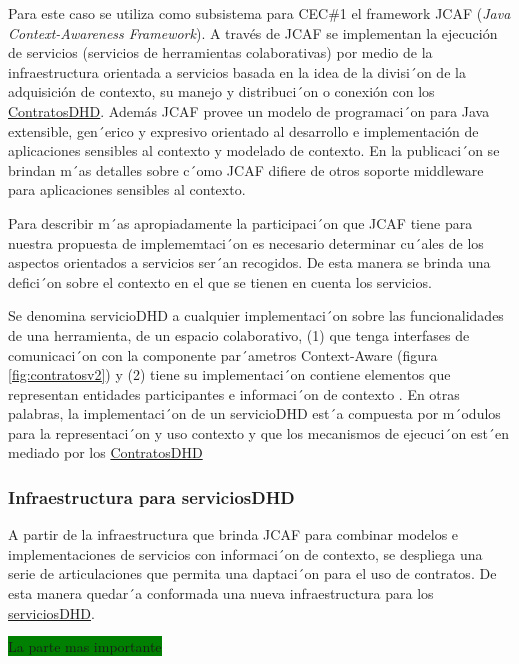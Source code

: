 Para este caso se utiliza como subsistema para CEC\#1 el framework JCAF 
(\textit{Java Context-Awareness Framework}). A través de JCAF se implementan
la ejecución de servicios (servicios de herramientas colaborativas) por medio de
la infraestructura orientada a servicios basada en la idea de la divisi´on de la
adquisición de contexto, su manejo y  distribuci´on o conexión con los
\hyperref[contratosDHD]{ContratosDHD}. Además JCAF provee un modelo de
programaci´on para Java extensible, gen´erico y expresivo orientado al
desarrollo e implementación de aplicaciones sensibles al contexto y modelado de contexto. En la  publicaci´on \cite{JCAF} se brindan m´as detalles sobre c´omo JCAF difiere de otros soporte middleware para aplicaciones sensibles al contexto. 


Para describir m´as apropiadamente la participaci´on que JCAF tiene para 
nuestra propuesta de implememtaci´on es necesario determinar cu´ales de los aspectos orientados a servicios ser´an recogidos. De esta manera se brinda una defici´on sobre el contexto en el que se tienen en cuenta los servicios.


\begin{defi}[ServiciosDHD:] \label{serviciosDHD}
Se denomina servicioDHD a cualquier implementaci´on sobre las funcionalidades
de una herramienta, de un espacio colaborativo, (1) que tenga interfases de
comunicaci´on con la componente par´ametros Context-Aware (figura
\ref{fig:contratosv2}) y  (2) tiene su implementaci´on contiene elementos que
representan entidades participantes e informaci´on de contexto \cite{Dey}. En
otras palabras, la implementaci´on de un servicioDHD est´a compuesta por
m´odulos para la representaci´on y uso contexto y que los mecanismos de
ejecuci´on est´en mediado por los \hyperref[contratosdhd]{ContratosDHD} 

\end{defi}


\subsubsection{Infraestructura para serviciosDHD}


A partir de la infraestructura que brinda JCAF para combinar modelos e implementaciones de servicios con informaci´on de contexto, se despliega una serie de articulaciones que permita una daptaci´on para el uso de contratos. De esta manera quedar´a conformada una nueva infraestructura para los \hyperref[serviciosDHD]{serviciosDHD}.  

\colorbox{green}{La parte mas importante}

